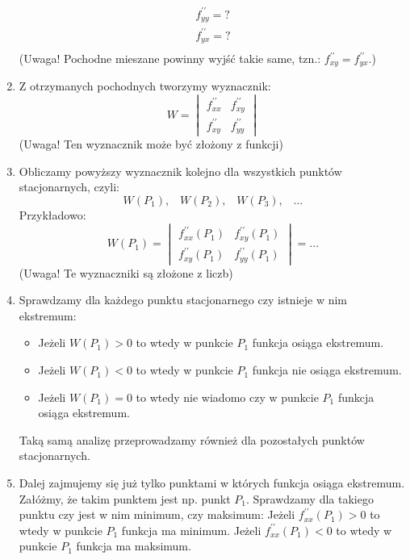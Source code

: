 \begin{enumerate}[itemsep=0pt,partopsep=0pt, parsep=0pt]
\[\begin{matrix}
            f^{\prime\prime}_{yy}=? \\
            f^{\prime\prime}_{yx}=? \\
        \end{matrix}
    \]
    (Uwaga! Pochodne mieszane powinny wyjść takie same, tzn.: $f^{\prime\prime}_{xy}=f^{\prime\prime}_{yx}$.)
    \item  Z otrzymanych pochodnych tworzymy wyznacznik:
    \[
        W=
        \begin{vmatrix}
            f^{\prime\prime}_{xx} & f^{\prime\prime}_{xy} \\
            f^{\prime\prime}_{xy} & f^{\prime\prime}_{yy}
        \end{vmatrix}
    \]
    (Uwaga! Ten wyznacznik może być złożony z funkcji)
    \item Obliczamy powyższy wyznacznik kolejno dla wszystkich punktów stacjonarnych, czyli:
    \[
        W(P_1)\text{,}\quad W(P_2)\text{,}\quad W(P_3)\text{,}\quad \dots
    \]
    Przykładowo:
    \[
        W(P_1)=
        \begin{vmatrix}
            f^{\prime\prime}_{xx}(P_1) & f^{\prime\prime}_{xy}(P_1) \\
            f^{\prime\prime}_{xy}(P_1) & f^{\prime\prime}_{yy}(P_1)
        \end{vmatrix}
        = \dots
    \]
    (Uwaga! Te wyznaczniki są złożone z liczb)
    \item Sprawdzamy dla każdego punktu stacjonarnego czy istnieje w nim ekstremum:
    \begin{itemize}[itemsep=0pt,partopsep=0pt, parsep=0pt]
        \item Jeżeli $W(P_1)>0$ to wtedy w punkcie $P_1$ funkcja osiąga ekstremum.
        \item Jeżeli $W(P_1)<0$ to wtedy w punkcie $P_1$ funkcja nie osiąga ekstremum.
        \item Jeżeli $W(P_1)=0$ to wtedy nie wiadomo czy w punkcie $P_1$ funkcja osiąga ekstremum.
    \end{itemize}
    Taką samą analizę przeprowadzamy również dla pozostałych punktów stacjonarnych.
    \item Dalej zajmujemy się już tylko punktami w których funkcja osiąga ekstremum.
    Załóżmy, że takim punktem jest np. punkt $P_1$.
    Sprawdzamy dla takiego punktu czy jest w nim minimum, czy maksimum:
    Jeżeli $f^{\prime\prime}_{xx}(P_1)>0$ to wtedy w punkcie $P_1$ funkcja ma minimum.
    Jeżeli $f^{\prime\prime}_{xx}(P_1)<0$ to wtedy w punkcie $P_1$ funkcja ma maksimum.

\end{enumerate}
